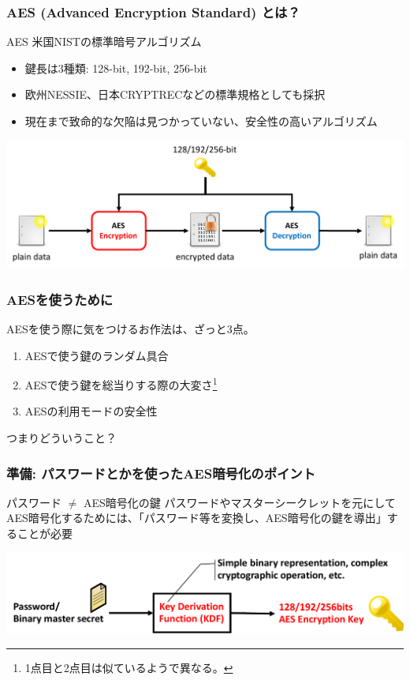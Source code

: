 \documentclass[12pt,dvipdfmx]{beamer}
\begin{document}
\begin{frame}
\frametitle{AES (Advanced Encryption Standard) とは？}
\begin{block}{AES}
米国NISTの標準暗号アルゴリズム\\
\begin{itemize}
 \item 鍵長は3種類: 128-bit, 192-bit, 256-bit
 \item 欧州NESSIE、日本CRYPTRECなどの標準規格としても採択
 \item 現在まで致命的な欠陥は見つかっていない、安全性の高いアルゴリズム
\end{itemize}
\end{block}
\begin{center}
\includegraphics[width=0.9\linewidth]{Figs/aes_flow.pdf}
\end{center}
\end{frame}


\begin{frame}
\frametitle{AESを使うために}
AESを使う際に気をつけるお作法は、ざっと3点。
\begin{enumerate}
 \item AESで使う鍵の\alert{ランダム具合}
 \item AESで使う鍵を\alert{総当りする際の大変さ}\footnote[frame]{1点目と2点目は似ているようで異なる。}
 \item AESの\alert{利用モードの安全性}
\end{enumerate}

\vspace{2ex}
つまりどういうこと？

\end{frame}

\begin{frame}
\frametitle{準備: パスワードとかを使ったAES暗号化のポイント}
\begin{block}{\small パスワード $\neq$ AES暗号化の鍵}
パスワードやマスターシークレットを元にしてAES暗号化するためには、「パスワード等を変換し、AES暗号化の鍵を導出」することが必要
\end{block}
\begin{center}
\includegraphics[width=\linewidth]{Figs/kdf_definition.pdf}
\end{center}
\end{frame}
\end{document}
